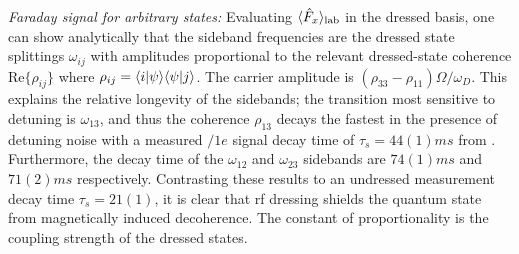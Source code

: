 \documentclass[aps,prl,reprint,superscriptaddress,floatfix]{revtex4-1}
\begin{document}
\textit{Faraday signal for arbitrary states:}
Evaluating $\langle \hat{F}_x \rangle_{\text{lab}}$ in the dressed basis, one can show analytically that the sideband frequencies are the dressed state splittings $\omega_{ij}$ with amplitudes proportional to the relevant dressed-state coherence $\text{Re}\{\rho_{ij}\}$ where $\rho_{ij} = \langle i \vert \psi \rangle \langle \psi \vert j \rangle $.
The carrier amplitude is $(\rho_{33} - \rho_{11}) \Omega / \omega_D$.
This explains the relative longevity of the sidebands; the transition most sensitive to detuning is $\omega_{13}$, and thus the coherence $\rho_{13}$ decays the fastest in the presence of detuning noise with a measured $/1e$ signal decay time of $\tau_{s}=44(1)\unit{ms}$ from . 
Furthermore, the decay time of the $\omega_{12}$ and $\omega_{23}$ sidebands are $74(1)\unit{ms}$ and $71(2)\unit{ms}$ respectively. 
Contrasting these results to an undressed measurement decay time $\tau_{s}=21(1)$, it is clear that rf dressing shields the quantum state from magnetically induced decoherence.
The constant of proportionality is the coupling strength of the dressed states.
\end{document}
